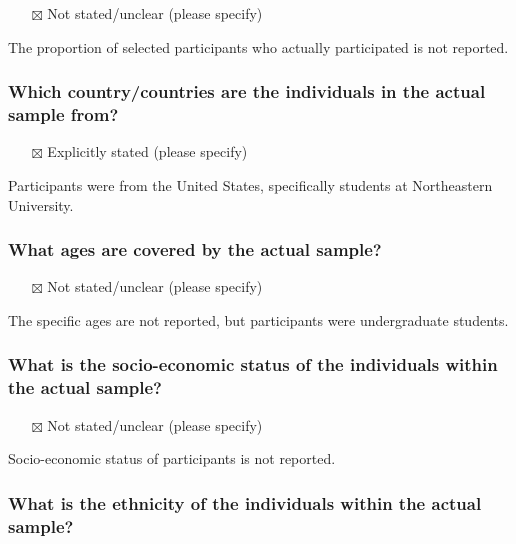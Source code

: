 \documentclass[
  doc, a4paper]{apa7}
\providecommand{\tightlist}{%
  \setlength{\itemsep}{0pt}\setlength{\parskip}{0pt}}
\begin{document}
\begin{itemize}
\tightlist
\item[$\boxtimes$]
  Not stated/unclear (please specify)
\end{itemize}

The proportion of selected participants who actually participated is not reported.

\subsubsection{Which country/countries are the individuals in the actual sample from?}\label{which-countrycountries-are-the-individuals-in-the-actual-sample-from}

\begin{itemize}
\tightlist
\item[$\boxtimes$]
  Explicitly stated (please specify)
\end{itemize}

Participants were from the United States, specifically students at Northeastern University.

\subsubsection{What ages are covered by the actual sample?}\label{what-ages-are-covered-by-the-actual-sample}

\begin{itemize}
\tightlist
\item[$\boxtimes$]
  Not stated/unclear (please specify)
\end{itemize}

The specific ages are not reported, but participants were undergraduate students.

\subsubsection{What is the socio-economic status of the individuals within the actual sample?}\label{what-is-the-socio-economic-status-of-the-individuals-within-the-actual-sample}

\begin{itemize}
\tightlist
\item[$\boxtimes$]
  Not stated/unclear (please specify)
\end{itemize}

Socio-economic status of participants is not reported.

\subsubsection{What is the ethnicity of the individuals within the actual sample?}\label{what-is-the-ethnicity-of-the-individuals-within-the-actual-sample}
\end{document}
